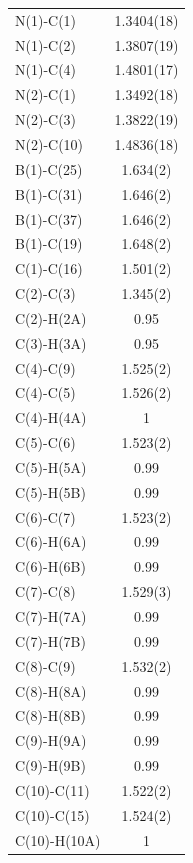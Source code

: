\begin{center}
\tablefirsthead{%
\toprule}
\tablelasttail{\bottomrule}
{\footnotesize \singlespacing
\begin{supertabular}{p{1.5in}c}
N(1)-C(1) &1.3404(18)\\
N(1)-C(2) &1.3807(19)\\
N(1)-C(4) &1.4801(17)\\
N(2)-C(1) &1.3492(18)\\
N(2)-C(3) &1.3822(19)\\
N(2)-C(10) &1.4836(18)\\
B(1)-C(25) &1.634(2)\\
B(1)-C(31) &1.646(2)\\
B(1)-C(37) &1.646(2)\\
B(1)-C(19) &1.648(2)\\
C(1)-C(16) &1.501(2)\\
C(2)-C(3) &1.345(2)\\
C(2)-H(2A) &0.95\\
C(3)-H(3A) &0.95\\
C(4)-C(9) &1.525(2)\\
C(4)-C(5) &1.526(2)\\
C(4)-H(4A) &1\\
C(5)-C(6) &1.523(2)\\
C(5)-H(5A) &0.99\\
C(5)-H(5B) &0.99\\
C(6)-C(7) &1.523(2)\\
C(6)-H(6A) &0.99\\
C(6)-H(6B) &0.99\\
C(7)-C(8) &1.529(3)\\
C(7)-H(7A) &0.99\\
C(7)-H(7B) &0.99\\
C(8)-C(9) &1.532(2)\\
C(8)-H(8A) &0.99\\
C(8)-H(8B) &0.99\\
C(9)-H(9A) &0.99\\
C(9)-H(9B) &0.99\\
C(10)-C(11) &1.522(2)\\
C(10)-C(15) &1.524(2)\\
C(10)-H(10A) &1\\

\end{supertabular}}
\end{center}
